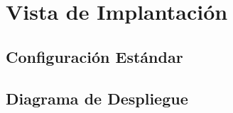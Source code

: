 \section{Vista de Implantación} \label{vistaImplantacion}

\subsection{Configuración Estándar}
\subsection{Diagrama de Despliegue}